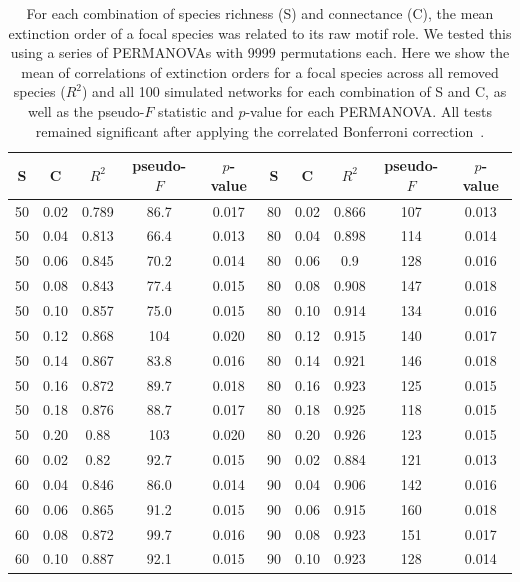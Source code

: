 \documentclass[12pt]{article}
\begin{document}
\begin{spacing}{2.0}
		\begin{table}[h!]
			\caption{For each combination of species richness (S) and connectance (C), the mean extinction order of a focal species was related to its raw motif role. We tested this using a series of PERMANOVAs with 9999 permutations each. Here we show the mean of correlations of extinction orders for a focal species across all removed species ($R^2$) and all 100 simulated networks for each combination of S and C, as well as the pseudo-$F$ statistic and $p$-value for each PERMANOVA. All tests remained significant after applying the correlated Bonferroni correction~\citep{Drezner2016}.}
			\label{permtable}
			\begin{tabular}{c c | c | c c ||c c | c | c c |}
				S	&	C	&	$R^2$	&	pseudo-$F$	&	$p$-value	&	S	&	C &	$R^2$	&	pseudo-$F$	&	$p$-value\\ 
				\hline
				50	&	0.02	&	0.789	&	86.7	&	0.017	&	80	&	0.02	&	0.866	&	107	&	0.013	\\
				50	&	0.04	&	0.813	&	66.4	&	0.013	&	80	&	0.04	&	0.898	&	114	&	0.014	\\
				50	&	0.06	&	0.845	&	70.2	&	0.014	&	80	&	0.06	&	0.9	&	128	&	0.016	\\  
				50	&	0.08	&	0.843	&	77.4	&	0.015	&	80	&	0.08	&	0.908	&	147	&	0.018	\\
				50	&	0.10	&	0.857	&	75.0	&	0.015	&	80	&	0.10	&	0.914	&	134	&	0.016	\\
				50	&	0.12	&	0.868	&	104	&	0.020	&	80	&	0.12	&	0.915	&	140	&	0.017	\\
				50	&	0.14	&	0.867	&	83.8	&	0.016	&	80	&	0.14	&	0.921	&	146	&	0.018	\\
				50	&	0.16	&	0.872	&	89.7	&	0.018	&	80	&	0.16	&	0.923	&	125	&	0.015	\\
				50	&	0.18	&	0.876	&	88.7	&	0.017	&	80	&	0.18	&	0.925	&	118	&	0.015	\\
				50	&	0.20	&	0.88	&	103	&	0.020	&	80	&	0.20	&	0.926	&	123	&	0.015	\\
				60	&	0.02	&	0.82	&	92.7	&	0.015	&	90	&	0.02	&	0.884	&	121	&	0.013	\\
				60	&	0.04	&	0.846	&	86.0	&	0.014	&	90	&	0.04	&	0.906	&	142	&	0.016	\\
				60	&	0.06	&	0.865	&	91.2	&	0.015	&	90	&	0.06	&	0.915	&	160	&	0.018	\\
				60	&	0.08	&	0.872	&	99.7	&	0.016	&	90	&	0.08	&	0.923	&	151	&	0.017	\\
				60	&	0.10	&	0.887	&	92.1	&	0.015	&	90	&	0.10	&	0.923	&	128	&	0.014	\\

\end{tabular}
\end{table}
\end{spacing}
\end{document}
